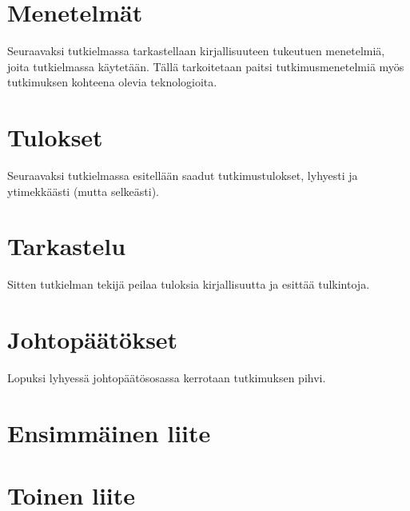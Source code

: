 \documentclass[finnish,utf8,kandi]{gradu3}
\begin{document}
\section{Menetelmät}

Seuraavaksi tutkielmassa tarkastellaan kirjallisuuteen tukeutuen
menetelmiä, joita tutkielmassa käytetään.  Tällä tarkoitetaan paitsi
tutkimusmenetelmiä myös tutkimuksen kohteena olevia teknologioita.

\section{Tulokset}

Seuraavaksi tutkielmassa esitellään saadut tutkimustulokset, lyhyesti
ja ytimekkäästi (mutta selkeästi).

\section{Tarkastelu}

Sitten tutkielman tekijä peilaa tuloksia kirjallisuutta ja esittää
tulkintoja.

\section{Johtopäätökset}

Lopuksi lyhyessä johtopäätösosassa kerrotaan tutkimuksen pihvi.


\printbibliography
\appendix

\section{Ensimmäinen liite}

\section{Toinen liite}
\end{document}
